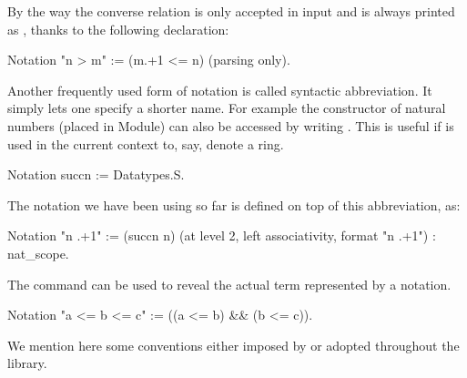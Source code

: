 
By the way the converse relation  is only accepted in input
and is always printed as  , thanks to the following declaration:

\begin{coq}{}{}
Notation "n > m"  := (m.+1 <= n) (parsing only).
\end{coq}

Another frequently used form of notation is called syntactic abbreviation.
It simply lets one specify a shorter name.  For example the  constructor
of natural numbers (placed in  Module) can also be accessed
by writing .  This is useful if  is used in the current context
to, say, denote a ring.

\begin{coq}{}{}
Notation succn := Datatypes.S.
\end{coq}

The notation  we have been using so far is defined on top of
this abbreviation, as:

\begin{coq}{}{}
Notation "n .+1" := (succn n) (at level 2, left associativity,
  format "n .+1") : nat_scope.
\end{coq}

The  command can be used to reveal the actual term
represented by a notation.

\begin{coq}{}{}
Notation "a <= b <= c" := ((a <= b) && (b <= c)).
\end{coq}



We mention here some conventions either imposed by \Coq{}
or adopted throughout the \mcbMC{} library.


